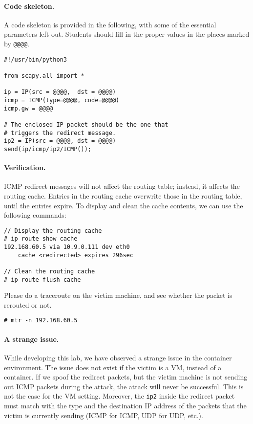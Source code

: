 \paragraph{Code skeleton.} A code skeleton is provided in the following, with
some of the essential parameters left out. Students should fill in the proper 
values in the places marked by \texttt{@@@@}.  


\begin{lstlisting}
#!/usr/bin/python3

from scapy.all import *

ip = IP(src = @@@@,  dst = @@@@)
icmp = ICMP(type=@@@@, code=@@@@)
icmp.gw = @@@@

# The enclosed IP packet should be the one that 
# triggers the redirect message. 
ip2 = IP(src = @@@@, dst = @@@@)
send(ip/icmp/ip2/ICMP());
\end{lstlisting}
 

\paragraph{Verification.}
ICMP redirect messages will not affect the routing table; instead, it 
affects the routing cache. Entries in the routing cache overwrite 
those in the routing table, until the entries expire. To display 
and clean the cache contents, we can use the following commands: 

\begin{lstlisting}
// Display the routing cache 
# ip route show cache
192.168.60.5 via 10.9.0.111 dev eth0
    cache <redirected> expires 296sec

// Clean the routing cache
# ip route flush cache
\end{lstlisting}


Please do a traceroute on the victim machine, and see whether the packet
is rerouted or not. 

\begin{lstlisting}
# mtr -n 192.168.60.5
\end{lstlisting}
 



\paragraph{A strange issue.} While developing this lab, we have observed
a strange issue in the container environment. The issue does not exist
if the victim is a VM, instead of a container. 
If we spoof the redirect packets, but the victim machine is not 
sending out ICMP packets during the attack, the attack will never be successful. 
This is not the case for the VM setting. 
Moreover, the \texttt{ip2} inside the redirect packet must match with the
type and the destination IP address of the packets 
that the victim is currently sending (ICMP for ICMP,
UDP for UDP, etc.). 


